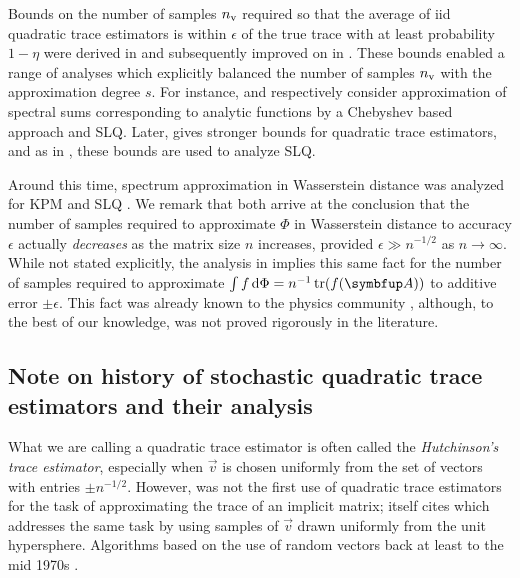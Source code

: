 Bounds on the number of samples \( n_{\textup{v}} \) required so that the average of iid quadratic trace estimators is within \( \epsilon \) of the true trace with at least probability \( 1-\eta \) were derived in \cite{avron_toledo_11} and subsequently improved on in \cite{roostakhorasani_ascher_14}.
These bounds enabled a range of analyses which explicitly balanced the number of samples \( n_{\textup{v}} \) with the approximation degree \( s \). 
For instance, \cite{han_malioutov_avron_shin_17} and \cite{ubaru_chen_saad_17} respectively consider approximation of spectral sums corresponding to analytic functions by a Chebyshev based approach and SLQ.
Later, \cite{cortinovis_kressner_21} gives stronger bounds for quadratic trace estimators, and as in \cite{ubaru_chen_saad_17}, these bounds are used to analyze SLQ.

Around this time, spectrum approximation in Wasserstein distance was analyzed for KPM \cite{braverman_krishnan_musco_22} and SLQ \cite{chen_trogdon_ubaru_21}.
We remark that \cite{braverman_krishnan_musco_22,chen_trogdon_ubaru_21} both arrive at the conclusion that the number of samples required to approximate \( \Phi \) in Wasserstein distance to accuracy \( \epsilon \) actually \emph{decreases} as the matrix size \( n \) increases, provided \( \epsilon \gg n^{-1/2} \) as \( n\to\infty \).
While not stated explicitly, the analysis in \cite{cortinovis_kressner_21} implies this same fact for the number of samples required to approximate \( \int f \,\d\Phi = n^{-1} \tr(\fA) \) to additive error \( \pm \epsilon \).
This fact was already known to the physics community \cite{weisse_wellein_alvermann_fehske_06}, although, to the best of our knowledge, was not proved rigorously in the literature.


\subsection{Note on history of stochastic quadratic trace estimators and their analysis}
\label{sec:trace_hist} 

What we are calling a quadratic trace estimator is often called the \emph{Hutchinson's trace estimator}, especially when \( \vec{v} \) is chosen uniformly from the set of vectors with entries \( \pm n^{-1/2} \).
However, \cite{hutchinson_89} was not the first use of quadratic trace estimators for the task of approximating the trace of an implicit matrix; \cite{hutchinson_89} itself cites \cite{girard_87} which addresses the same task by using samples of \( \vec{v} \) drawn uniformly from the unit hypersphere.
Algorithms based on the use of random vectors back at least to the mid 1970s \cite{alben_blume_krakauer_schwartz_75,weaire_williams_76,weaire_williams_77,deraedt_devries_89}.

